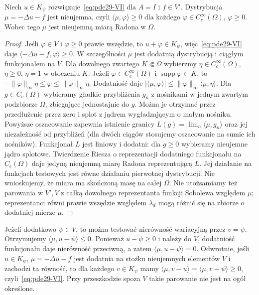 \begin{stwierdzenie}
\label{prop:pde29-lambda-measure}
Niech $u\in K_\psi$ rozwiązuje~\eqref{eq:pde29-VI}
dla $A=I$ i $f\in V'$. Dystrybucja
$\mu=-\Delta u-f$ jest nieujemna, czyli
$\langle\mu,\varphi\rangle\ge0$ dla każdego
$\varphi\in C_c^\infty(\Omega)$, $\varphi\ge0$.
Wobec tego $\mu$ jest nieujemną miarą Radona w $\Omega$.
\end{stwierdzenie}
\begin{proof}
Jeśli $\varphi\in V$ i $\varphi\ge0$ prawie wszędzie,
to $u+\varphi\in K_\psi$,
więc~\eqref{eq:pde29-VI} daje
$\langle-\Delta u-f,\varphi\rangle\ge0$.
W szczególności $\mu$ jest dodatnią dystrybucją
i ciągłym funkcjonałem na $V$.
Dla dowolnego zwartego $K\Subset\Omega$ wybierzmy
$\eta\in C_c^\infty(\Omega)$, $\eta\ge0$, $\eta=1$
w otoczeniu $K$. Jeżeli $\varphi\in C_c^\infty(\Omega)$ i
$\operatorname{supp}\varphi\subset K$,
to $-\|\varphi\|_\infty\eta\le\varphi\le
\|\varphi\|_\infty\eta$. Dodatniość daje
$|\langle\mu,\varphi\rangle|\le
\|\varphi\|_\infty\langle\mu,\eta\rangle$.
Dla $g\in C_c(\Omega)$ wybieramy gładkie
przybliżenia $g_n$ z nośnikami w jednym zwartym
podzbiorze $\Omega$, zbiegające jednostajnie do $g$.
Można je otrzymać przez przedłużenie przez zero
i splot z jądrem wygładzającym o małym nośniku.
Powyższe oszacowanie zapewnia istnienie granicy
$L(g)=\lim_n\langle\mu,g_n\rangle$ oraz jej
niezależność od przybliżeń (dla dwóch ciągów
stosujemy oszacowanie na sumie ich nośników).
Funkcjonał $L$ jest liniowy i dodatni:
dla $g\ge0$ wybieramy nieujemne jądro splotowe.
Twierdzenie Riesza o reprezentacji dodatniego
funkcjonału na $C_c(\Omega)$ daje jedyną
nieujemną miarę Radona reprezentującą $L$.
Jej działanie na funkcjach testowych jest
równe działaniu pierwotnej dystrybucji.
Nie wnioskujemy, że miara ma skończoną masę
na całej $\Omega$. Nie utożsamiamy też parowania
w $V',V$ z całką dowolnego reprezentanta
funkcji Sobolewa względem $\mu$; reprezentanci
równi prawie wszędzie względem $\lambda_d$
mogą różnić się na zbiorze o dodatniej mierze $\mu$.
\end{proof}

\begin{uwaga}
Jeżeli dodatkowo $\psi\in V$, to można testować
nierówność wariacyjną przez $v=\psi$.
Otrzymujemy $\langle\mu,u-\psi\rangle\le0$.
Ponieważ $u-\psi\ge0$ i należy do $V$, dodatniość
funkcjonału daje nierówność przeciwną, a zatem
$\langle\mu,u-\psi\rangle=0$.
Odwrotnie, jeśli $u\in K_\psi$, $\mu=-\Delta u-f$
jest dodatnia na stożku nieujemnych elementów $V$
i zachodzi ta równość, to dla każdego $v\in K_\psi$
mamy $\langle\mu,v-u\rangle
=\langle\mu,v-\psi\rangle\ge0$, czyli~\eqref{eq:pde29-VI}.
Przy przeszkodzie spoza $V$ takie parowanie
nie jest na ogół określone.
\end{uwaga}


